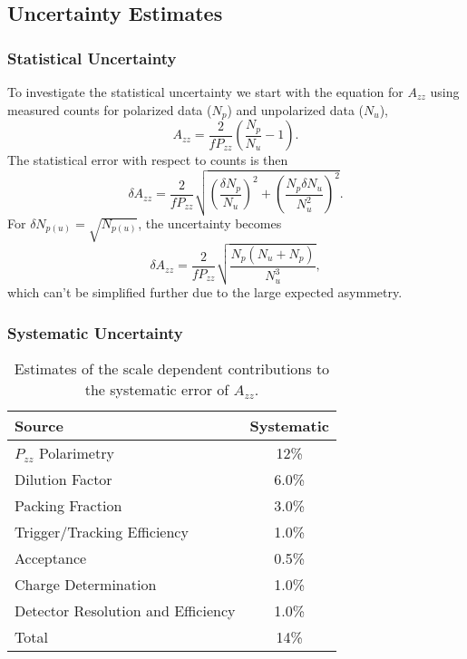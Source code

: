\subsection{Uncertainty Estimates}
\subsubsection{Statistical Uncertainty}
\label{stat}
To investigate the statistical uncertainty we start with the equation for $A_{zz}$ using
measured counts for polarized data ($N_p$) and unpolarized data ($N_u$), 
\begin{equation}
A_{zz}=\frac{2}{fP_{zz}}\left(\frac{N_p}{N_u}-1\right).
\end{equation}
The statistical error with respect to counts is then
\begin{equation}
\delta A_{zz}=\frac{2}{fP_{zz}}\sqrt{\left(\frac{\delta N_p}{N_u}\right)^2+\left(\frac{N_p\delta N_u}{N_u^2}\right)^2}.
\end{equation}
For $\delta N_{p(u)}=\sqrt{N_{p(u)}}$, the uncertainty becomes
\begin{equation}
\delta A_{zz}=\frac{2}{fP_{zz}}\sqrt{\frac{N_p(N_u + N_p)}{N_u^3}},
\end{equation}
which can't be simplified further due to the large expected asymmetry.


\subsubsection{Systematic Uncertainty}%
\begin{table}
\begin{center}
\begin{tabular}{l|c}\hline\hline
Source								& Systematic \\
\hline
$P_{zz}$ Polarimetry					& 12\%   \\
Dilution Factor						& 6.0\%   \\
Packing Fraction						& 3.0\%   \\
Trigger/Tracking Efficiency			& 1.0\% \\
Acceptance							& 0.5\% \\
Charge Determination					& 1.0\%  \\
Detector Resolution and Efficiency	& 1.0\% \\
\hline
Total								& 14\%   \\
\hline
\end{tabular}
\caption{\label{error1}Estimates of the scale dependent contributions to the systematic error of $A_{zz}$.}
\end{center}
\end{table}

